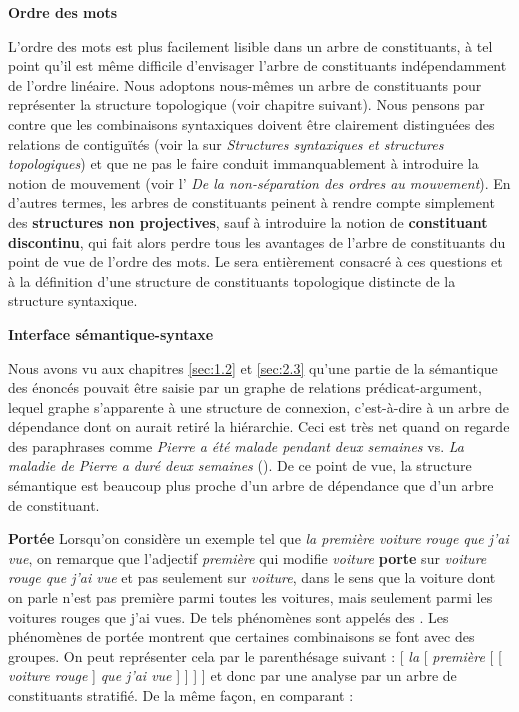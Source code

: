 {    \smallskip\noindent\textbf{Ordre des mots}

    L’ordre des mots est plus facilement lisible dans un arbre de constituants, à tel point qu’il est même difficile d’envisager l’arbre de constituants indépendamment de l’ordre linéaire. Nous adoptons nous-mêmes un arbre de constituants pour représenter la structure topologique (voir chapitre suivant). Nous pensons par contre que les combinaisons syntaxiques doivent être clairement distinguées des relations de contiguïtés (voir la  sur \textit{Structures syntaxiques et structures topologiques}) et que ne pas le faire conduit immanquablement à introduire la notion de mouvement (voir l' \textit{De la non-séparation des ordres au mouvement}). En d’autres termes, les arbres de constituants peinent à rendre compte simplement des \textbf{structures non projectives}, sauf à introduire la notion de \textbf{constituant discontinu}, qui fait alors perdre tous les avantages de l’arbre de constituants du point de vue de l’ordre des mots. Le  sera entièrement consacré à ces questions et à la définition d’une structure de constituants topologique distincte de la structure syntaxique.

   \smallskip\noindent\textbf{Interface sémantique-syntaxe}

    Nous avons vu aux chapitres \ref{sec:1.2} et \ref{sec:2.3} qu’une partie de la sémantique des énoncés pouvait être saisie par un graphe de relations prédicat-argument, lequel graphe s’apparente à une structure de connexion, c’est-à-dire à un arbre de dépendance dont on aurait retiré la hiérarchie. Ceci est très net quand on regarde des paraphrases comme \textit{Pierre a été malade pendant deux semaines} vs. \textit{La maladie de Pierre a duré deux semaines} (). De ce point de vue, la structure sémantique est beaucoup plus proche d’un arbre de dépendance que d’un arbre de constituant.

    \smallskip\noindent\textbf{Portée}
    Lorsqu’on considère un exemple tel que \textit{la première voiture rouge que j’ai vue}, on remarque que l’adjectif \textit{première} qui modifie \textit{voiture} \textbf{porte} sur \textit{voiture rouge que j’ai vue} et pas seulement sur \textit{voiture}, dans le sens que la voiture dont on parle n’est pas première parmi toutes les voitures, mais seulement parmi les voitures rouges que j’ai vues. De tels phénomènes sont appelés des . Les phénomènes de portée montrent que certaines combinaisons se font avec des groupes. On peut représenter cela par le parenthésage suivant :
    \ea{}
    [ \textit{la} [ \textit{première} [ [ \textit{voiture rouge} ] \textit{que j’ai vue} ] ] ] ]
    \z
    et donc par une analyse par un arbre de constituants stratifié. De la même façon, en comparant :

}
